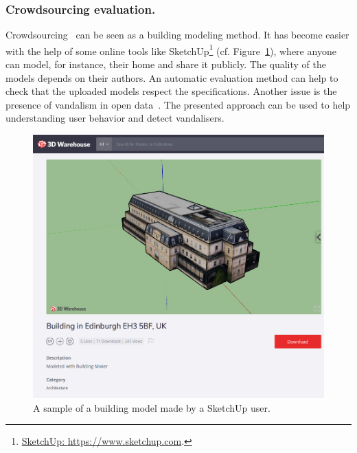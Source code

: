             \subsubsection{Crowdsourcing evaluation.}
            Crowdsourcing~\parencite{kovashka2016crowdsourcing} can be seen as a building modeling method.
            It has become easier with the help of some online tools like SketchUp\footnote{
                \href{https://www.sketchup.com}{SketchUp: \url{https://www.sketchup.com}}.
            } (cf. Figure~\ref{fig::crowdsourcing}), where anyone can model, for instance, their home and share it publicly.
            The quality of the models depends on their authors.
            An automatic evaluation method can help to check that the uploaded models respect the specifications.
            Another issue is the presence of vandalism in open data~\parencite{neis2012towards}.
            The presented approach can be used to help understanding user behavior and detect vandalisers.
            \begin{figure}[htb]
                \centering
                \includegraphics[width=.7\textwidth]{images/introduction/use/crowdsourcing}
                \caption{
                    \label{fig::crowdsourcing}
                    A sample of a building model made by a SketchUp user.
                }
            \end{figure}

